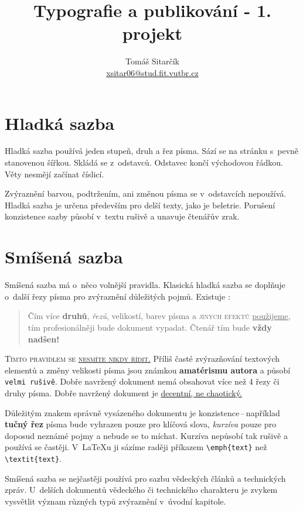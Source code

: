 \documentclass[10pt, twocolumn, a4paper]{article}
\title{Typografie a publikování - 1. projekt}
\author{Tomáš Sitarčík \\ \href{mailto:xsitar06@stud.fit.vutbr.cz}{xsitar06@stud.fit.vutbr.cz}}
\date{}
\begin{document}
\twocolumn

\maketitle
\section{Hladká sazba}
Hladká sazba používá jeden stupeň, druh a řez písma.
Sází se na stránku s~pevně stanovenou šířkou.
Skládá se z~odstavců. Odstavec končí východovou řádkou.
Věty nesmějí začínat číslicí.

Zvýraznění barvou, podtržením, ani změnou písma se v~odstavcích nepoužívá.
Hladká sazba je určena především pro delší texty, jako je beletrie.
Porušení konzistence sazby působí v~textu rušivě a unavuje čtenářův zrak.

\section{Smíšená sazba}

Smíšená sazba má o~něco volnější pravidla.
Klasická hladká sazba se doplňuje o~další řezy písma pro zvýraznění důležitých pojmů.
Existuje :

\begin{quotation}
    Čím více \textbf{druhů}, \textit{řezů}, {\tiny velikostí,} {\color{green}barev} písma a {\color{blue}\textsc{jiných efektů}} \underline{použijeme}, {\color{red}tím profesionálněji} bude {\selectfont dokument} vypadat. Čtenář tím bude \textbf{\Huge vždy nadšen!}
\end{quotation}

\textsc{Tímto pravidlem se \underline{nesmíte nikdy řídit.}}
Příliš časté zvýrazňování textových elementů a změny velikosti písma jsou známkou \textbf{amatérismu autora} a působí \texttt{velmi rušivě}.
Dobře navržený dokument nemá obsahovat více než 4 řezy či druhy písma.
Dobře navržený dokument je \underline{decentní, ne chaotický.}

Důležitým znakem správně vysázeného dokumentu je konzistence\,--\,například \textbf{tučný řez} písma bude vyhrazen pouze pro klíčová slova, \textit{kurzíva} pouze pro doposud neznámé pojmy a nebude se to míchat.
Kurzíva nepůsobí tak rušivě a používá se častěji.
V~\LaTeX u ji sázíme raději příkazem \verb|\emph{text}| než \verb|\textit{text}|.

Smíšená sazba se nejčastěji používá pro sazbu vědeckých článků a technických zpráv.
U~delších dokumentů vědeckého či technického charakteru je zvykem vysvětlit význam různých typů zvýraznění v~úvodní kapitole.
\end{document}
